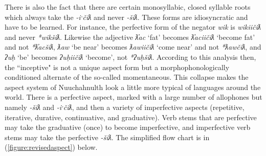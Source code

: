 There is also the fact that there are certain monosyllabic, closed syllable roots which always take the \textit{-iˑčiƛ} and never \textit{-šiƛ}. These forms are idiosyncratic and have to be learned. For instance, the perfective form of the negator \textit{wik} is \textit{wikiičiƛ} and never \textit{*wikšiƛ}. Likewise the adjective \textit{ƛ̓ac} `fat' becomes \textit{ƛ̓aciičiƛ} `become fat' and not \textit{*ƛ̓acšiƛ}, \textit{ƛaw} `be near' becomes \textit{ƛawiičiƛ} `come near' and not \textit{*ƛawčiƛ}, and \textit{ʔuḥ} `be' becomes \textit{ʔuḥiičiƛ} `become', not \textit{*ʔuḥšiƛ}. According to this analysis then, the ``inceptive" is not a unique aspect form but a morphophonologically conditioned alternate of the so-called momentaneous. This collapse makes the aspect system of Nuuchahnulth look a little more typical of languages around the world. There is a perfective aspect, marked with a large number of allophones but namely \textit{-šiƛ} and \textit{-iˑčiƛ}, and then a variety of imperfective aspects (repetitive, iterative, durative, continuative, and graduative). Verb stems that are perfective may take the graduative (once) to become imperfective, and imperfective verb stems may take the perfective \textit{-šiƛ}. The simplified flow chart is in (\ref{figure:revisedaspect}) below.

